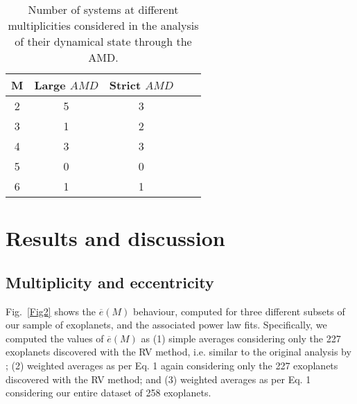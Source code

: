 \documentclass[letter]{aa} %
\begin{document}
        \begin{table}
                \caption{Number of systems at different multiplicities considered in the analysis of their dynamical state through the AMD.}             %
                \label{table:2}      %
                \centering                          %
                \begin{tabular}{c c c c c}        %
                        \hline\hline                 %
                        M & Large $AMD$ & Strict $AMD$  \\    %
                        \hline                        %
                        2 & 5 & 3 \\      %
                        3 & 1 & 2 \\
                        4 & 3 & 3 \\
                        5 & 0 & 0 \\
                        6 & 1 & 1 \\ 
                        \hline                                   %
                \end{tabular}
        \end{table}
        
        \section{Results and discussion}
        
        \subsection{Multiplicity and eccentricity}
        
        Fig.~\ref{Fig2} shows the $\overline{e}(M)$ behaviour, computed for three different subsets of our sample of exoplanets, and the associated power law fits.  Specifically, we computed the values of $\overline{e}(M)$ as (1) simple averages considering only the 227 exoplanets discovered with the RV method, i.e. similar to the original analysis by \cite{limbach}; (2) weighted averages as per Eq. 1 again considering only the 227 exoplanets discovered with the RV method; and (3) weighted averages as per Eq. 1 considering our entire dataset of 258 exoplanets.
        
\end{document}
